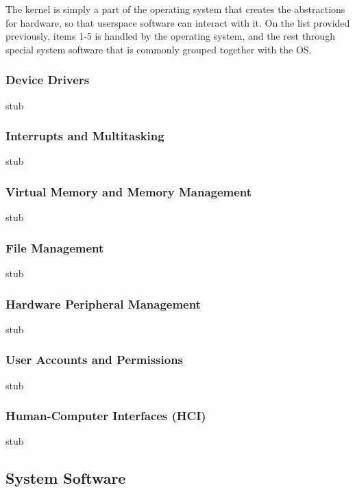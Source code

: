 \documentclass[../main.tex]{subfiles}
\begin{document}
The kernel is simply a part of the operating system that creates the abstractions for hardware, so that userspace software can interact with it. On the list provided previously, items 1-5 is handled by the operating system, and the rest through special system software that is commonly grouped together with the OS. 

\subsubsection{Device Drivers}

stub

\subsubsection{Interrupts and Multitasking}

stub

\subsubsection{Virtual Memory and Memory Management}

stub

\subsubsection{File Management}

stub

\subsubsection{Hardware Peripheral Management}

stub

\subsubsection{User Accounts and Permissions}

stub

\subsubsection{Human-Computer Interfaces (HCI)}

stub

\subsection{System Software}
\end{document}

